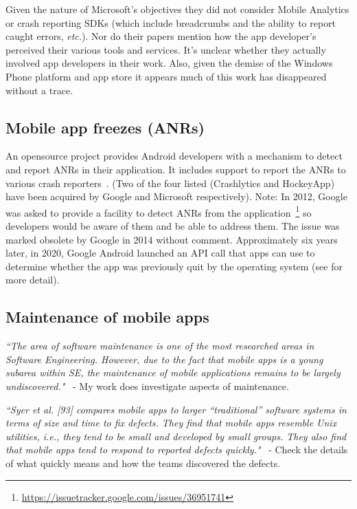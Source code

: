 Given the nature of Microsoft's objectives they did not consider Mobile Analytics or crash reporting SDKs (which include breadcrumbs and the ability to report caught errors, \emph{etc.}). Nor do their papers mention how the app developer's perceived their various tools and services. It's unclear whether they actually involved app developers in their work. Also, given the demise of the Windows Phone platform and app store it appears much of this work has disappeared without a trace.



\subsection{Mobile app freezes (ANRs)}
An opensource project provides Android developers with a mechanism to detect and report ANRs in their application. It includes support to report the ANRs to various crash reporters~\cite{salomonbrys_github_anr_watchdog}. (Two of the four listed (Crashlytics and HockeyApp) have been acquired by Google and Microsoft respectively). Note: In 2012, Google was asked to provide a facility to detect ANRs from the application~\footnote{\url{https://issuetracker.google.com/issues/36951741}} so developers would be aware of them and be able to address them. The issue was marked obsolete by Google in 2014 without comment. Approximately six years later, in 2020, Google Android launched an API call that apps can use to determine whether the app was previously quit by the operating system (see  for more detail). 

\subsection{Maintenance of mobile apps}

\emph{``The area of software maintenance is one of the most researched areas in Software Engineering. However, due to the fact that mobile apps is a young subarea within SE, the maintenance of mobile applications remains to be largely undiscovered."}~\cite[p. 27]{nagappan2016_future_trends_in_sw_eng_for_mobile_apps} - My work does investigate aspects of maintenance. 

\emph{``Syer et al. [93] compares mobile apps to larger “traditional” software systems in terms of size and time to fix defects. They find that mobile apps resemble Unix utilities, i.e., they tend to be small and developed by small groups. They also find that mobile apps tend to respond to reported defects quickly."}~\cite[p. 27]{nagappan2016_future_trends_in_sw_eng_for_mobile_apps} - Check the details of what quickly means and how the teams discovered the defects.

